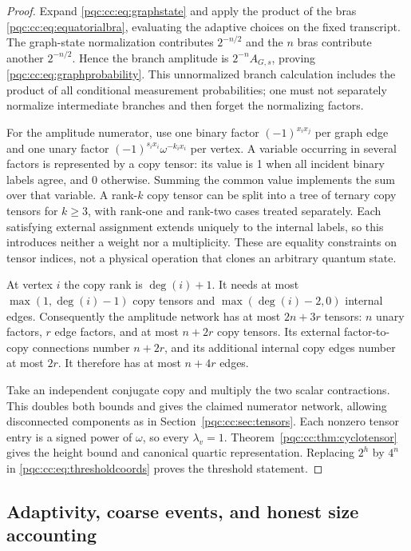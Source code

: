 \documentclass[11pt,letterpaper]{article}
\numberwithin{equation}{section}
\theoremstyle{definition}
\theoremstyle{remark}
\begin{document}
\begin{proof}
Expand \eqref{pqc:cc:eq:graphstate} and apply the product of the bras
\eqref{pqc:cc:eq:equatorialbra}, evaluating the adaptive choices on the fixed
transcript. The graph-state normalization contributes $2^{-n/2}$ and the $n$
bras contribute another $2^{-n/2}$. Hence the branch amplitude is
$2^{-n}A_{G,s}$, proving \eqref{pqc:cc:eq:graphprobability}. This unnormalized branch
calculation includes the product of all conditional measurement probabilities;
one must not separately normalize intermediate branches and then forget the
normalizing factors.

For the amplitude numerator, use one binary factor
$(-1)^{x_i x_j}$ per graph edge and one unary factor
$(-1)^{s_i x_i}\omega^{-k_i x_i}$ per vertex. A variable occurring in several
factors is represented by a copy tensor: its value is 1 when all incident
binary labels agree, and 0 otherwise. Summing the common value implements the
sum over that variable. A rank-$k$ copy tensor can be split into a tree of
ternary copy tensors for $k\ge3$, with rank-one and rank-two cases treated
separately. Each satisfying external assignment extends uniquely to the
internal labels, so this introduces neither a weight nor a multiplicity.
These are equality constraints on tensor indices, not a physical operation
that clones an arbitrary quantum state.

At vertex $i$ the copy rank is $\deg(i)+1$. It needs at most
$\max(1,\deg(i)-1)$ copy tensors and $\max(\deg(i)-2,0)$ internal edges.
Consequently the amplitude network has at most $2n+3r$ tensors: $n$ unary
factors, $r$ edge factors, and at most $n+2r$ copy tensors. Its external
factor-to-copy connections number $n+2r$, and its additional internal copy
edges number at most $2r$. It therefore has at most $n+4r$ edges.

Take an independent conjugate copy and multiply the two scalar contractions.
This doubles both bounds and gives the claimed numerator network, allowing
disconnected components as in Section~\ref{pqc:cc:sec:tensors}. Each nonzero tensor
entry is a signed power of $\omega$, so every $\lambda_v=1$.
Theorem~\ref{pqc:cc:thm:cyclotensor} gives the height bound and canonical quartic
representation. Replacing $2^h$ by $4^n$ in
\eqref{pqc:cc:eq:thresholdcoords} proves the threshold statement.
\end{proof}

\subsection{Adaptivity, coarse events, and honest size accounting}
\end{document}

